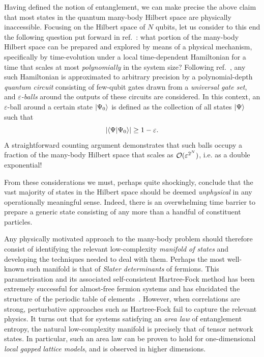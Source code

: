 \bigskip\noindent Having defined the notion of entanglement, we can make precise the above claim that most states in the quantum many-body Hilbert space are physically inaccessible. Focusing on the Hilbert space of $N$ qubits, let us consider to this end the following question put forward in ref.~\cite{Poulin2011}: what portion of the many-body Hilbert space can be prepared and explored by means of a physical mechanism, specifically by time-evolution under a local time-dependent Hamiltonian for a time that scales at most \emph{polynomially} in the system size? Following ref.~\cite{Poulin2011}, any such Hamiltonian is approximated to arbitrary precision by a polynomial-depth \emph{quantum circuit} consisting of few-qubit gates drawn from a \emph{universal gate set}, and \emph{$\varepsilon$-balls} around the outputs of these circuits are considered. In this context, an $\varepsilon$-ball around a certain state $| \Psi_0 \rangle$ is defined as the collection of all states $|\Psi \rangle$ such that
\begin{equation}
	|\langle \Psi | \Psi_0\rangle| \geq 1 - \varepsilon.
\end{equation}
A straightforward counting argument demonstrates that such balls occupy a fraction of the many-body Hilbert space that scales as $\mathcal{O}(\varepsilon^{2^N})$, i.e. as a double exponential!

From these considerations we must, perhaps quite shockingly, conclude that the vast majority of states in the Hilbert space should be deemed \emph{unphysical} in any operationally meaningful sense. Indeed, there is an overwhelming time barrier to prepare a generic state consisting of any more than a handful of constituent particles.

\bigskip\noindent Any physically motivated approach to the many-body problem should therefore consist of identifying the relevant low-complexity \emph{manifold of states} and developing the techniques needed to deal with them. Perhaps the most well-known such manifold is that of \emph{Slater determinants} of fermions. This parametrisation and its associated self-consistent Hartree-Fock method has been extremely successful for almost-free fermion systems and has elucidated the structure of the periodic table of elements~\cite{Slater1929,Slater1935,Hartree1947}. However, when correlations are strong, perturbative approaches such as Hartree-Fock fail to capture the relevant physics. It turns out that for systems satisfying an \emph{area law} of entanglement entropy, the natural low-complexity manifold is precisely that of tensor network states. In particular, such an area law can be proven to hold for one-dimensional \emph{local gapped} \emph{lattice models}, and is observed in higher dimensions.
